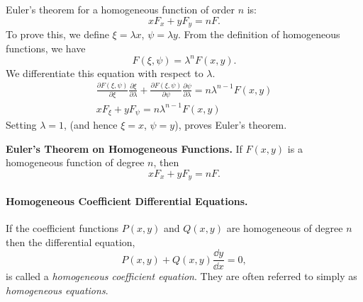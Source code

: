 Euler's theorem for a homogeneous function of order $n$ is:
\[
x F_x + y F_y = n F.
\]
To prove this, we define $\xi = \lambda x$, $\psi = \lambda y$.
From the definition of homogeneous functions, we have
\[
F(\xi, \psi) = \lambda^n F(x,y).
\]
We differentiate this equation with respect to $\lambda$.
\begin{gather*}
  \frac{\partial F(\xi,\psi)}{\partial \xi} \frac{\partial \xi}{\partial \lambda}
  + \frac{\partial F(\xi,\psi)}{\partial \psi} \frac{\partial \psi}{\partial \lambda}
  = n \lambda^{n-1} F(x,y) \\
  x F_\xi + y F_\psi = n \lambda^{n-1} F(x,y)
\end{gather*}
Setting $\lambda = 1$, (and hence $\xi = x$, $\psi = y$),
proves Euler's theorem.


\begin{Result}
  \textbf{Euler's Theorem on Homogeneous Functions.}
  If $F(x, y)$ is a homogeneous function of degree $n$, then
  \[
  x F_x + y F_y = n F.
  \]
\end{Result}








\paragraph{Homogeneous Coefficient Differential Equations.}
If the coefficient functions $P(x, y)$ and $Q(x, y)$ are homogeneous of 
degree $n$ then the differential equation,
\begin{equation}
  \label{homogeneous differential equation}
  P(x, y) + Q(x, y) \frac{\dd y}{\dd x} = 0,
\end{equation}
is called a \textit{homogeneous coefficient equation}.  They are often
referred to simply as \textit{homogeneous equations}.   



